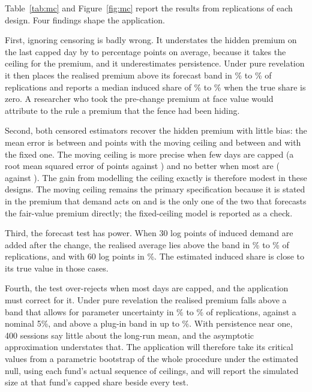 

Table~\ref{tab:mc} and Figure~\ref{fig:mc} report the results from \mcReps{} replications of each design. Four findings shape the application.

First, ignoring censoring is badly wrong. It understates the hidden premium on the last capped day by \mcBiasNaiveA{} to \mcBiasNaiveC{} percentage points on average, because it takes the ceiling for the premium, and it underestimates persistence. Under pure revelation it then places the realised premium above its forecast band in \mcSizeNaiveMin\% to \mcSizeNaiveMax\% of replications and reports a median induced share of \mcIotaNaiveMin\% to \mcIotaNaiveMax\% when the true share is zero. A researcher who took the pre-change premium at face value would attribute to the rule a premium that the fence had been hiding.

Second, both censored estimators recover the hidden premium with little bias: the mean error is between \mcBiasMovMin{} and \mcBiasMovMax{} points with the moving ceiling and between \mcBiasFixMin{} and \mcBiasFixMax{} with the fixed one. The moving ceiling is more precise when few days are capped (a root mean squared error of \mcRmseMovA{} points against \mcRmseFixA) and no better when most are (\mcRmseMovC{} against \mcRmseFixC). The gain from modelling the ceiling exactly is therefore modest in these designs. The moving ceiling remains the primary specification because it is stated in the premium that demand acts on and is the only one of the two that forecasts the fair-value premium directly; the fixed-ceiling model is reported as a check.

Third, the forecast test has power. When 30 log points of induced demand are added after the change, the realised average lies above the band in \mcPowMovLoMin\% to \mcPowMovLoMax\% of replications, and with 60 log points in \mcPowMovHiMin\%. The estimated induced share is close to its true value in those cases.

Fourth, the test over-rejects when most days are capped, and the application must correct for it. Under pure revelation the realised premium falls above a band that allows for parameter uncertainty in \mcSizeMovMin\% to \mcSizeMovMax\% of replications, against a nominal 5\%, and above a plug-in band in up to \mcPlugMovMax\%. With persistence near one, 400 sessions say little about the long-run mean, and the asymptotic approximation understates that. The application will therefore take its critical values from a parametric bootstrap of the whole procedure under the estimated null, using each fund's actual sequence of ceilings, and will report the simulated size at that fund's capped share beside every test.

